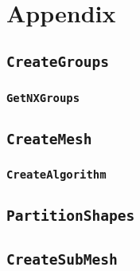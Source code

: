 
\chapter{Appendix} %
\label{cha:appendix}

\section{\texttt{CreateGroups}} %
\label{sec:creategroups}

\subsection{\texttt{GetNXGroups}} %
\label{sub:getnxgroups}


\section{\texttt{CreateMesh}} %
\label{sec:createmesh}

\subsection{\texttt{CreateAlgorithm}} %
\label{sub:createalgorithm}


\section{\texttt{PartitionShapes}} %
\label{sec:partitionshapes}


\section{\texttt{CreateSubMesh}} %
\label{sec:createsubmesh}


